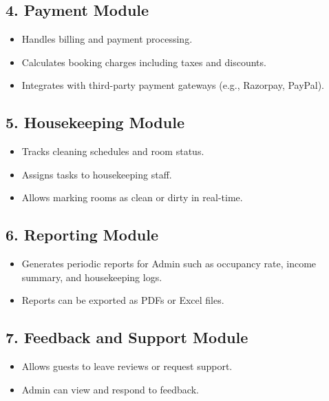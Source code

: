 \documentclass[a4paper,12pt]{article}
\begin{document}
\subsection{4. Payment Module}
\begin{itemize}
    \item Handles billing and payment processing.
    \item Calculates booking charges including taxes and discounts.
    \item Integrates with third-party payment gateways (e.g., Razorpay, PayPal).
\end{itemize}

\subsection{5. Housekeeping Module}
\begin{itemize}
    \item Tracks cleaning schedules and room status.
    \item Assigns tasks to housekeeping staff.
    \item Allows marking rooms as clean or dirty in real-time.
\end{itemize}

\subsection{6. Reporting Module}
\begin{itemize}
    \item Generates periodic reports for Admin such as occupancy rate, income summary, and housekeeping logs.
    \item Reports can be exported as PDFs or Excel files.
\end{itemize}

\subsection{7. Feedback and Support Module}
\begin{itemize}
    \item Allows guests to leave reviews or request support.
    \item Admin can view and respond to feedback.
\end{itemize}
\end{document}
